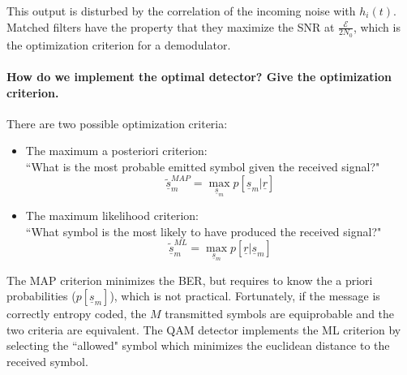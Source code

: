 This output is disturbed by the correlation of the incoming noise with $h_i(t)$. Matched filters have the property that they maximize the SNR at $\frac{\mathcal{E}}{2N_0}$, which is the optimization criterion for a demodulator.

\paragraph{How do we implement the optimal detector? Give the optimization criterion.}
There are two possible optimization criteria:
\begin{itemize}
  \item The maximum a posteriori criterion:\\
  ``What is the most probable emitted symbol given the received signal?"
  \[
  \underline{\tilde{s}}_m^{MAP} = \max_{\underline{s}_m} p[\underline{s}_m|\underline{r}]
  \]
  \item The maximum likelihood criterion:\\
  ``What symbol is the most likely to have produced the received signal?"
  \[
  \underline{\tilde{s}}_m^{ML} = \max_{\underline{s}_m} p[\underline{r}|\underline{s}_m]
  \]
\end{itemize}

The MAP criterion minimizes the BER, but requires to know the a priori probabilities ($p[\underline{s}_m]$), which is not practical. Fortunately, if the message is correctly entropy coded, the $M$ transmitted symbols are equiprobable and the two criteria are equivalent.
The QAM detector implements the ML criterion by selecting the ``allowed" symbol which minimizes the euclidean distance to the received symbol.
